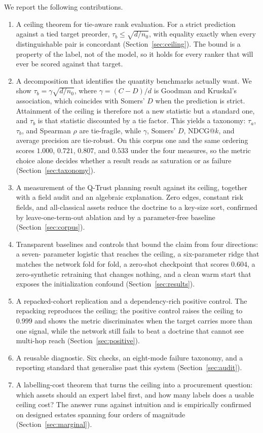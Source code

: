 \documentclass[journal,10pt]{IEEEtran}
\newcommand{\tb}{\tau_b}
\newcommand{\distinct}{d}
\newcommand{\nzero}{n_0}
\begin{document}
We report the following contributions.
\begin{enumerate}
\item A ceiling theorem for tie-aware rank evaluation. For a strict prediction against a tied
target preorder, $\tb\le\sqrt{\distinct/\nzero}$, with equality exactly when every distinguishable
pair is concordant (Section~\ref{sec:ceiling}). The bound is a property of the label, not of the
model, so it holds for every ranker that will ever be scored against that target.
\item A decomposition that identifies the quantity benchmarks actually want. We show
$\tb=\gamma\sqrt{\distinct/\nzero}$, where $\gamma=(C-D)/\distinct$ is Goodman and Kruskal's
association, which coincides with Somers' $D$ when the prediction is strict. Attainment of the
ceiling is therefore not a new statistic but a standard one, and $\tb$ is that statistic
discounted by a tie factor. This yields a taxonomy: $\tau_a$, $\tb$, and Spearman $\rho$ are
tie-fragile, while $\gamma$, Somers' $D$, NDCG@$k$, and average precision are tie-robust. On this
corpus one and the same ordering scores $1.000$, $0.721$, $0.807$, and $0.533$ under the four
measures, so the metric choice alone decides whether a result reads as saturation or as failure
(Section~\ref{sec:taxonomy}).
\item A measurement of the Q-Trust planning result against its ceiling, together with a field audit
and an algebraic explanation. Zero edges, constant risk fields, and all-classical assets reduce the
doctrine to a key-size sort, confirmed by leave-one-term-out ablation and by a parameter-free
baseline (Section~\ref{sec:corpus}).
\item Transparent baselines and controls that bound the claim from four directions: a seven-
parameter logistic that reaches the ceiling, a six-parameter ridge that matches the network fold
for fold, a zero-shot checkpoint that scores $0.604$, a zero-synthetic retraining that changes
nothing, and a clean warm start that exposes the initialization confound
(Section~\ref{sec:results}).
\item A repacked-cohort replication and a dependency-rich positive control. The repacking
reproduces the ceiling; the positive control raises the ceiling to $0.999$ and shows the metric
discriminates when the target carries more than one signal, while the network still fails to beat a
doctrine that cannot see multi-hop reach (Section~\ref{sec:positive}).
\item A reusable diagnostic. Six checks, an eight-mode failure taxonomy, and a reporting standard
that generalise past this system (Section~\ref{sec:audit}).
\item A labelling-cost theorem that turns the ceiling into a procurement question: which assets
should an expert label first, and how many labels does a usable ceiling cost? The answer runs
against intuition and is empirically confirmed on designed estates spanning four orders of
magnitude (Section~\ref{sec:marginal}).
\end{enumerate}
\end{document}
